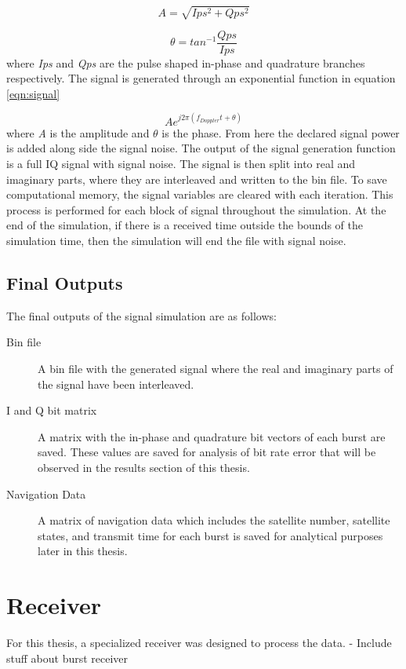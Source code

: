 \documentclass[12pt]{report}
\begin{document}
\begin{equation}
    A = \sqrt{Ips^2 + Qps^2}
    \label{eqn:amplitude}
\end{equation}

\begin{equation}
    \theta = tan^{-1} \frac{Qps}{Ips}
    \label{eqn:phase}
\end{equation}
where \textit{Ips} and \textit{Qps} are the pulse shaped in-phase and quadrature branches respectively. The signal is generated through an exponential function in equation \ref{eqn:signal}

\begin{equation}
    A e^{j2\pi (f_{Doppler}t + \theta)}
    \label{eqn:signal}
\end{equation}
where \textit{A} is the amplitude and $\theta$ is the phase. From here the declared signal power is added along side the signal noise. The output of the signal generation function is a full IQ signal with signal noise. The signal is then split into real and imaginary parts, where they are interleaved and written to the bin file. To save computational memory, the signal variables are cleared with each iteration. This process is performed for each block of signal throughout the simulation. At the end of the simulation, if there is a received time outside the bounds of the simulation time, then the simulation will end the file with signal noise.

\subsection{Final Outputs}
The final outputs of the signal simulation are as follows:
\begin{description}
    \item[Bin file] A bin file with the generated signal where the real and imaginary parts of the signal have been interleaved.
    \item[I and Q bit matrix] A matrix with the in-phase and quadrature bit vectors of each burst are saved. These values are saved for analysis of bit rate error that will be observed in the results section of this thesis.
    \item[Navigation Data] A matrix of navigation data which includes the satellite number, satellite states, and transmit time for each burst is saved for analytical purposes later in this thesis.
\end{description}
\section{Receiver}
For this thesis, a specialized receiver was designed to process the data. 
- Include stuff about burst receiver
\end{document}
